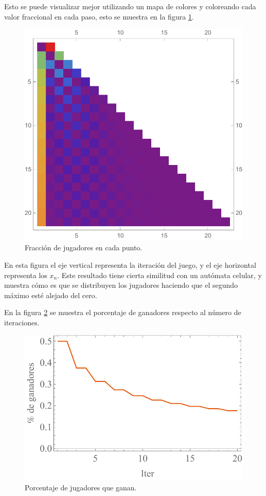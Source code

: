 \documentclass[letterpaper,11pt]{article}
\begin{document}
Esto se puede visualizar mejor utilizando un mapa de colores y coloreando cada valor fraccional en cada paso, esto se muestra en la figura \ref{fig:AC}.
\begin{figure}[h!]
\centering
\includegraphics[scale=0.6]{img/Fig7}
\caption{Fracción de jugadores en cada punto.}
\label{fig:AC}
\end{figure}
En esta figura el eje vertical representa la iteración del juego, y el eje horizontal representa los $x_n$. Este resultado tiene cierta similitud con un autómata celular, y muestra cómo es que se distribuyen los jugadores haciendo que el segundo máximo esté alejado del cero.

En la figura \ref{fig:Winners} se muestra el porcentaje de ganadores respecto al número de iteraciones.

\begin{figure}[h!]
\centering
\includegraphics[scale=0.6]{img/Fig8}
\caption{Porcentaje de jugadores que ganan.}
\label{fig:Winners}
\end{figure}
\end{document}

